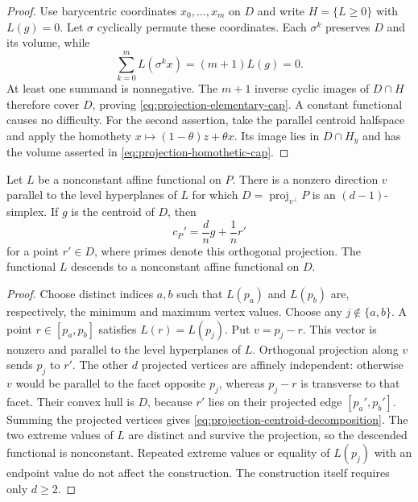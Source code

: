 \begin{proof}
Use barycentric coordinates $x_0,\ldots,x_m$ on $D$ and write
$H=\{L\geq0\}$ with $L(g)=0$.  Let $\sigma$ cyclically permute these
coordinates.  Each $\sigma^k$ preserves $D$ and its volume, while
\[
 \sum_{k=0}^m L(\sigma^k x)=(m+1)L(g)=0.
\]
At least one summand is nonnegative.  The $m+1$ inverse cyclic images
of $D\cap H$ therefore cover $D$, proving
\eqref{eq:projection-elementary-cap}.  A constant functional causes
no difficulty.  For the second assertion, take the parallel centroid
halfspace and apply the homothety
$x\mapsto(1-\theta)z+\theta x$.  Its image lies in $D\cap H_y$ and
has the volume asserted in \eqref{eq:projection-homothetic-cap}.
\end{proof}

\begin{lemma}
\label{lem:projection-separator}
Let $L$ be a nonconstant affine functional on $P$.  There is a nonzero
direction $v$ parallel to the level hyperplanes of $L$ for which
$D=\operatorname{proj}_{v^\perp}P$ is an $(d-1)$-simplex.  If $g$ is
the centroid of $D$, then
\begin{equation}
 c_P'=\frac d n g+\frac1n r'
 \label{eq:projection-centroid-decomposition}
\end{equation}
for a point $r'\in D$, where primes denote this orthogonal projection.
The functional $L$ descends to a nonconstant affine functional on $D$.
\end{lemma}

\begin{proof}
Choose distinct indices $a,b$ such that $L(p_a)$ and $L(p_b)$ are,
respectively, the minimum and maximum vertex values.  Choose any
$j\notin\{a,b\}$.  A point $r\in[p_a,p_b]$ satisfies
$L(r)=L(p_j)$.  Put $v=p_j-r$.  This vector is nonzero and parallel
to the level hyperplanes of $L$.  Orthogonal projection along $v$
sends $p_j$ to $r'$.  The other $d$ projected vertices are affinely
independent: otherwise $v$ would be parallel to the facet opposite
$p_j$, whereas $p_j-r$ is transverse to that facet.  Their convex hull
is $D$, because $r'$ lies on their projected edge $[p_a',p_b']$.
Summing the projected vertices gives
\eqref{eq:projection-centroid-decomposition}.  The two extreme values
of $L$ are distinct and survive the projection, so the descended
functional is nonconstant.  Repeated extreme values or equality of
$L(p_j)$ with an endpoint value do not affect the construction.
The construction itself requires only $d\geq2$.
\end{proof}

